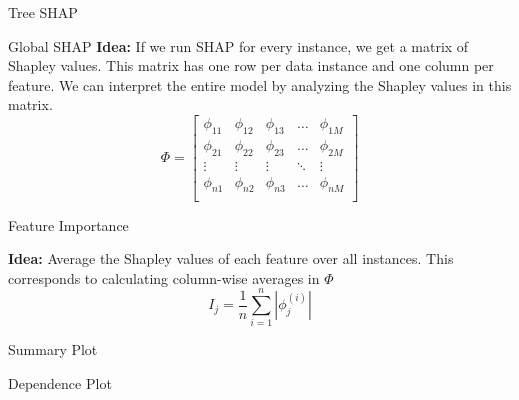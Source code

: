 \documentclass[11pt,compress,t,notes=noshow, aspectratio=169, xcolor=table]{beamer}
\begin{document}
\begin{vbframe}{Tree SHAP}

\end{vbframe}

 \begin{vbframe}{Global SHAP}
\textbf{Idea: }
If we run SHAP for every instance, we get a matrix of Shapley values. This matrix has one row per data instance and one column per feature. We can interpret the entire model by analyzing the Shapley values in this matrix.
\vspace{2cm}
$$
\Phi =
\begin{bmatrix}
    \phi_{11} & \phi_{12} & \phi_{13} & \dots  & \phi_{1M} \\
    \phi_{21} & \phi_{22} & \phi_{23} & \dots  & \phi_{2M} \\
    \vdots & \vdots & \vdots & \ddots & \vdots \\
    \phi_{n1} & \phi_{n2} & \phi_{n3} & \dots  & \phi_{nM} \\
\end{bmatrix}
$$

 \end{vbframe}

 \begin{vbframe}{Feature Importance}
 
\textbf{Idea:} Average the Shapley values of each feature over all instances. This corresponds to calculating column-wise averages in $\Phi$
$$
I_{j}=\frac{1}{n} \sum_{i=1}^{n}\left|\phi_{j}^{(i)}\right|
$$
\end{vbframe}
 
\begin{vbframe}{Summary Plot}
\end{vbframe} 

\begin{vbframe}{Dependence Plot}
\end{vbframe}
\end{document}
